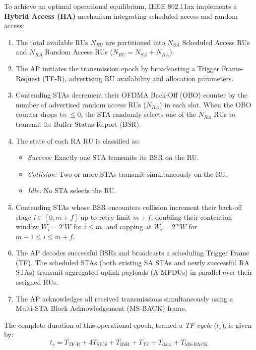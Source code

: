 To achieve an optimal operational equilibrium, IEEE 802.11ax implements a \textbf{Hybrid Access (HA)} mechanism integrating scheduled access and random access:
\begin{enumerate}
    \item The total available RUs $N_{RU}$ are partitioned into $N_{SA}$ Scheduled Access RUs and $N_{RA}$ Random Access RUs ($N_{RU} = N_{SA} + N_{RA}$).
    \item The AP initiates the transmission epoch by broadcasting a Trigger Frame-Request (TF-R), advertising RU availability and allocation parameters.
    \item Contending STAs decrement their OFDMA Back-Off (OBO) counter by the number of advertised random access RUs ($N_{RA}$) in each slot. When the OBO counter drops to $\le 0$, the STA randomly selects one of the $N_{RA}$ RUs to transmit its Buffer Status Report (BSR).
    \item The state of each RA RU is classified as:
    \begin{itemize}
        \item \emph{Success:} Exactly one STA transmits its BSR on the RU.
        \item \emph{Collision:} Two or more STAs transmit simultaneously on the RU.
        \item \emph{Idle:} No STA selects the RU.
    \end{itemize}
    \item Contending STAs whose BSR encounters collision increment their back-off stage $i \in [0, m+f]$ up to retry limit $m+f$, doubling their contention window $W_i = 2^i W$ for $i \le m$, and capping at $W_i = 2^m W$ for $m+1 \le i \le m+f$.
    \item The AP decodes successful BSRs and broadcasts a scheduling Trigger Frame (TF). The scheduled STAs (both existing SA STAs and newly successful RA STAs) transmit aggregated uplink payloads (A-MPDUs) in parallel over their assigned RUs.
    \item The AP acknowledges all received transmissions simultaneously using a Multi-STA Block Acknowledgement (MS-BACK) frame.
\end{enumerate}
The complete duration of this operational epoch, termed a \textit{TF-cycle} ($t_s$), is given by:
\begin{equation}
    t_s = T_{\text{TF-R}} + 4 T_{\text{SIFS}} + T_{\text{BSR}} + T_{\text{TF}} + T_{\text{data}} + T_{\text{MS-BACK}}
\end{equation}

